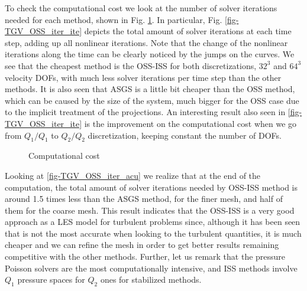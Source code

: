 To check the computational cost we look at the number of solver iterations needed for each method, shown in Fig. \ref{fig-TGV_OSS_iter}. In particular, Fig. \ref{fig-TGV_OSS_iter_ite} depicts the total amount of solver iterations at each time step, adding up all nonlinear iterations. Note that the change of the nonlinear iterations along the time can be clearly noticed by the jumps on the curves. We see that the cheapest method is the OSS-ISS for both discretizations, $32^3$ and $64^3$ velocity DOFs, with much less solver iterations per time step than the other methods. It is also seen that ASGS is a little bit cheaper than the OSS method, which can be caused by the size of the system, much bigger for the OSS case due to the implicit treatment of the projections. An interesting result also seen in \ref{fig-TGV_OSS_iter_ite} is the improvement on the computational cost when we go from $Q_1/Q_1$ to $Q_2/Q_2$ discretization, keeping constant the number of DOFs.
\begin{figure}[h!]
  \centering
  \caption{Computational cost}
  \label{fig-TGV_OSS_iter}
\end{figure}
Looking at \ref{fig-TGV_OSS_iter_acu} we realize that at the end of the computation, the total amount of solver iterations needed by OSS-ISS method is around 1.5 times less than the ASGS method, for the finer mesh, and half of them for the coarse mesh. This result indicates that the OSS-ISS is a very good approach as a LES model for turbulent problems since, although it has been seen that is not the most accurate when looking to the turbulent quantities, it is much cheaper and we can refine the mesh in order to get better results remaining competitive with the other methods. Further, let us remark that the pressure Poisson solvers are the most computationally intensive, and ISS methods involve $Q_1$ pressure spaces for $Q_2$ ones for stabilized methods.

